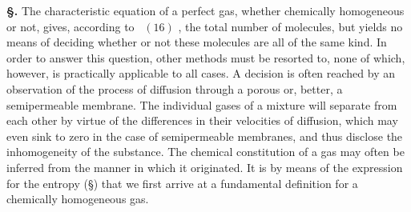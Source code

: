 \documentclass[12pt]{book}[2005/09/16]
\newcommand{\Chg}[2]{#2}
\newcommand{\Section}[1]{
  \medskip\par\textbf{§\;#1}
  \label{section:#1}
}
\newcommand{\SecRef}[2][§\;]{\hyperref[section:#2.]{{\upshape #1#2}}}
\newcommand{\Eq}[1]{%
  \hyperref[eqn:#1]{\ensuremath{#1}}%
}
\begin{document}
\Section{42.} The characteristic equation of a perfect gas, whether
%
%
chemically homogeneous or not, gives, according to~\Eq{(16)}, the
total number of molecules, but yields no means of deciding
whether or not these molecules are all of the same kind. In
order to answer this question, other methods must be resorted
to, none of which, however, is practically applicable to all
cases. A decision is often reached by an observation of the
process of diffusion through a porous or, better, a semipermeable
membrane. The individual gases of a mixture
will separate from each other by virtue of the differences in
their velocities of diffusion, which may even sink to zero in
the case of \Chg{semi-permeable}{semipermeable} membranes, and thus disclose
the inhomogeneity of the substance. The chemical constitution
of a gas may often be inferred from the manner in
which it originated. It is by means of the expression for
the entropy (\SecRef{237}) that we first arrive at a fundamental
definition for a chemically homogeneous gas.
\end{document}
